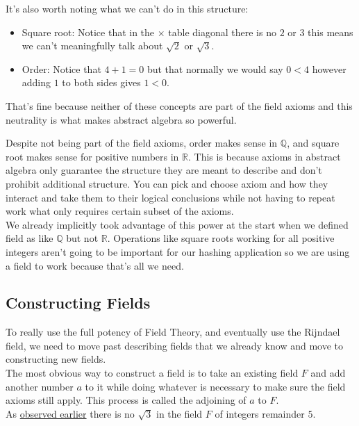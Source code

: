 It's also worth noting what we can't do in this structure:
\begin{itemize}
	\item Square root: Notice that in the $\times$ table diagonal there is no $2$ or $3$ this means we can't meaningfully talk about $\sqrt{2}$ or $\sqrt{3}$.
	\item Order: Notice that $4+1 = 0$ but that normally we would say $0<4$ however adding $1$ to both sides gives $1<0$.
\end{itemize}

That's fine because neither of these concepts are part of the field axioms
and this neutrality is what makes abstract algebra so powerful.

Despite not being part of the field axioms, order makes sense in $\mathbb{Q}$, and square root makes sense for positive numbers in $\mathbb{R}$.
This is because axioms in abstract algebra only guarantee the structure they are meant to describe and don't prohibit additional structure.
You can pick and choose axiom and how they interact and take them to their logical conclusions while not having to repeat work what only requires certain subset of the axioms.
\\

We already implicitly took advantage of this power at the start when we defined field as like $\mathbb{Q}$ but not $\mathbb{R}$.
Operations like square roots working for all positive integers aren't going to be important for our hashing application so we are using a field to work because that's all we need.

\subsection{Constructing Fields}
To really use the full potency of Field Theory,
and eventually use the Rijndael field,
we need to move past describing fields that we already know and move to constructing new fields.
\\

The most obvious way to construct a field is to take an existing field $F$ and add another number $a$ to it while doing whatever is necessary to make sure the field axioms still apply.
This process is called the adjoining of $a$ to $F$.
\\

As \hyperref[intro:gf5]{observed earlier} there is no $\sqrt{3}$ in the field $F$ of integers remainder $5$.
\\

